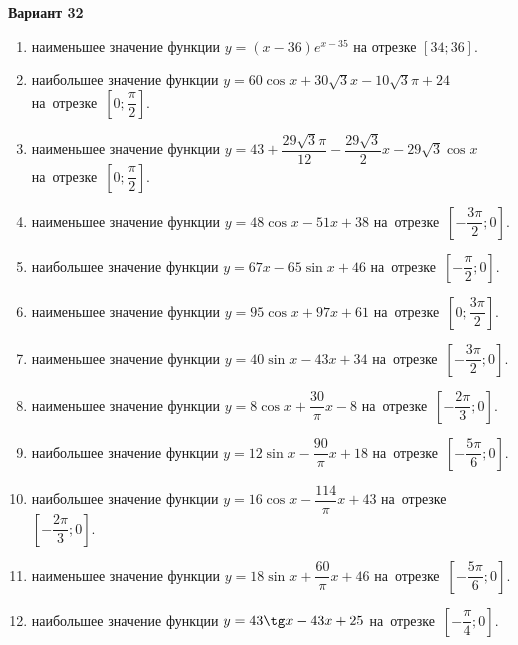 \documentclass[a4paper,10pt]{article}
\begin{document}
\begin{center}\Large\textbf{Вариант 32}\end{center}

\begin{enumerate}
\item {} наименьшее значение функции $y = \left(x-36\right)e^{x-35}$ на отрезке $\left[34;36\right]$.

\item {} наибольшее значение функции $y = 60\cos x+30\sqrt{3}x-10\sqrt{3}\pi +24$ на~отрезке~$\left[0;\dfrac{\pi }{2}\right]$.

\item {} наименьшее значение функции $y = 43+\dfrac{29\sqrt{3} \pi}{12}-\dfrac{29\sqrt{3}}{2}x-29\sqrt{3}\cos x$ на~отрезке~$\left[0;\dfrac{\pi }{2}\right]$.

\item {} наименьшее значение функции $y = 48\cos x-51x+38$ на~отрезке~$\left[-\dfrac{3\pi }{2};0\right]$.

\item {} наибольшее значение функции $y = 67x-65\sin x+46$ на~отрезке~$\left[-\dfrac{\pi }{2};0\right]$.

\item {} наименьшее значение функции $y = 95\cos x+97x+61$ на~отрезке~$\left[0;\dfrac{3\pi }{2}\right]$.

\item {} наименьшее значение функции $y = 40\sin x-43x+34$ на~отрезке~$\left[-\dfrac{3\pi }{2};0\right]$.

\item {} наименьшее значение функции $y = 8\cos x+\dfrac{30}{\pi }x -8$ на~отрезке~$\left[-\dfrac{2\pi }{3};0\right]$.

\item {} наибольшее значение функции $y = 12\sin x-\dfrac{90}{\pi }x+18$ на~отрезке~$\left[-\dfrac{5\pi }{6};0\right]$.

\item {} наибольшее значение функции $y = 16\cos x-\dfrac{114}{\pi }x+43$ на~отрезке~$\left[-\dfrac{2\pi }{3};0\right]$.

\item {} наименьшее значение функции $y = 18\sin x+\dfrac{60}{\pi }x+46$ на~отрезке~$\left[-\dfrac{5\pi }{6};0\right]$.

\item {} наибольшее значение функции $y = 43\tg x-43x+25$ на~отрезке~$\left[-\dfrac{\pi }{4};0\right]$.


\end{enumerate}
\end{document}
